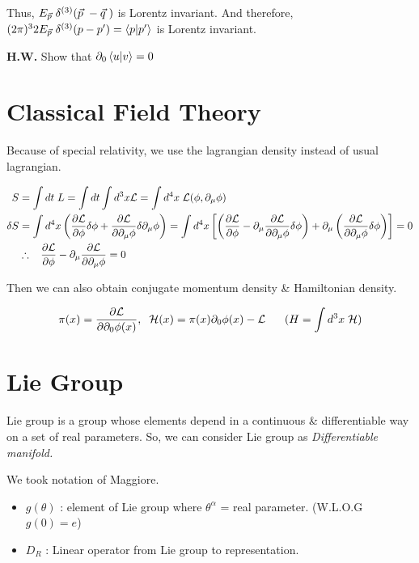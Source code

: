 \documentclass[11pt,letterpaper]{article}
\begin{document}
Thus, $E_{\vec{p}\hspace{0.1cm}}\delta^{(3)}(\vec{p}\hspace{0.1cm}-\vec{q}\hspace{0.1cm})$ is Lorentz invariant. And therefore, $(2\pi)^3 2E_{\vec{p}\hspace{0.1cm}}\delta^{(3)}(p-p') = \braket{p|p'}$ is Lorentz invariant.
\vs

\textbf{H.W.} Show that $\partial_0 \braket{u|v} = 0$
\newpage

\section*{Classical Field Theory}

Because of special relativity, we use the lagrangian density instead of usual lagrangian.

\begin{equation}
\begin{split}
  S &= \int dt \hspace{0.1cm} L = \int dt \int d^3x \mathcal{L} = \int d^4x \hspace{0.1cm} \mathcal{L}(\phi, \partial_\mu \phi) \\
  \delta S &= \int d^4x \left( \dfrac{\partial \mathcal{L}}{\partial \phi}\delta{\phi}+\dfrac{\partial \mathcal{L}}{\partial \partial_\mu\phi}\delta\partial_\mu\phi \right) = \int d^4x 
  \left[\left( \dfrac{\partial \mathcal{L}}{\partial \phi}-\partial_\mu\dfrac{\partial \mathcal{L}}{\partial \partial_\mu\phi}\delta\phi \right)+\partial_\mu\left( \dfrac{\partial \mathcal{L}}{\partial \partial_\mu\phi}\delta\phi \right)\right]=0 \\
  &\therefore \hspace{0.3cm} \dfrac{\partial \mathcal{L}}{\partial \phi} - \partial_\mu\dfrac{\partial \mathcal{L}}{\partial \partial_\mu\phi} = 0
\end{split}
\end{equation}

Then we can also obtain conjugate momentum density \& Hamiltonian density.

\begin{equation}
 \pi(x) = \PD{\L}{\partial_0 \phi(x)}\Com \hs \H(x) = \pi(x)\partial_0\phi(x) - \L \HS \HS (H = \int d^3x\hs\H)
\end{equation}

\HL

\section*{Lie Group}

Lie group is a group whose elements depend in a continuous \& differentiable way on a set of real parameters.
So, we can consider Lie group as \textit{Differentiable manifold.}

We took notation of Maggiore.
\begin{itemize}
 \item $g(\theta)$ : element of Lie group where $\theta^\alpha$ = real parameter.  (W.L.O.G $g(0)=e$)
 \item $D_R$ : Linear operator from Lie group to representation.
\end{itemize}
\end{document}
